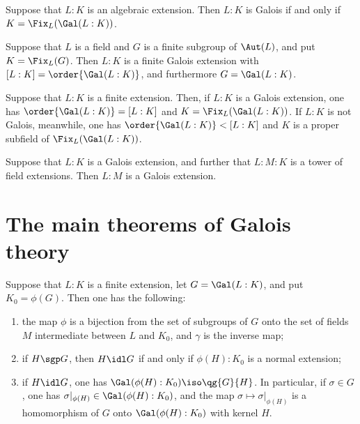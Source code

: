 \documentclass{article}
\begin{document}
  \begin{ttheorem}
    Suppose that \( L:K \) is an algebraic extension. Then \( L:K \) is Galois if and only if \( K=\Fix_L(\Gal(L:K)) \).
  \end{ttheorem}

  \begin{ttheorem}
    Suppose that \( L \) is a field and \( G \) is a finite subgroup of \( \Aut(L) \), and put \( K=\Fix_L(G) \). Then \( L:K \) is a finite Galois extension with \( [L:K]=\order{\Gal(L:K)} \), and furthermore \( G=\Gal(L:K) \).
  \end{ttheorem}

  \begin{ttheorem}
    Suppose that \( L:K \) is a finite extension. Then, if \( L:K \) is a Galois extension, one has \( \order{\Gal(L:K)}=[L:K] \) and \( K=\Fix_L(\Gal(L:K)) \). If \( L:K \) is not Galois, meanwhile, one has \( \order{\Gal(L:K)}<[L:K] \) and \( K \) is a proper subfield of \( \Fix_L(\Gal(L:K)) \).
  \end{ttheorem}

  \begin{tproposition}
    Suppose that \( L:K \) is a Galois extension, and further that \( L:M:K \) is a tower of field extensions. Then \( L:M \) is a Galois extension.
  \end{tproposition}

\section{The main theorems of Galois theory}
  \begin{ttheorem}
    Suppose that \( L:K \) is a finite extension, let \( G=\Gal(L:K) \), and put \( K_0=\phi(G) \). Then one has the following:
    \begin{enumerate}[label=(\alph*)]
      \item the map \( \phi \) is a bijection from the set of subgroups of \( G \) onto the set of fields \( M \) intermediate between \( L \) and \( K_0 \), and \( \gamma \) is the inverse map;
      \item if \( H\sgp G \), then \( H\idl G \) if and only if \( \phi(H):K_0 \) is a normal extension;
      \item if \( H\idl G \), one has \( \Gal(\phi(H):K_0)\iso \qg{G}{H} \). In particular, if \( \sigma\in G \), one has \( \sigma|_{\phi(H)}\in \Gal(\phi(H):K_0) \), and the map \( \sigma\mapsto\sigma|_{\phi(H)} \) is a homomorphism of \( G \) onto \( \Gal(\phi(H):K_0) \) with kernel \( H \).
    \end{enumerate}
  \end{ttheorem}
\end{document}

